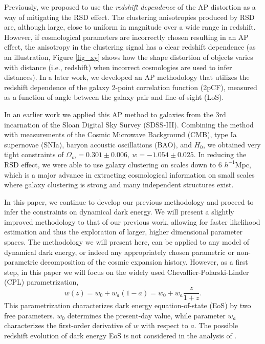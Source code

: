 \documentclass[iop]{emulateapj}
\begin{document}
Previously, we proposed to use the {\it redshift dependence} of the AP distortion\cite{Li2014} as a way of mitigating the RSD effect. The clustering anisotropies produced by RSD are, although large, close to uniform in magnitude over a wide range in redshift.  However, if cosmological parameters are incorrectly chosen resulting in an AP effect, 
the anisotropy in the clustering signal has a clear redshift dependence
(as an illustration, Figure \ref{fig_xy} shows how the shape distortion of objects varies with distance (i.e., redshift) 
when incorrect cosmologies are used to infer distances).
In a later work\cite{Li2015}, we developed an AP methodology 
that utilizes the redshift dependence of the galaxy 2-point correlation function (2pCF), 
measured as a function of angle between the galaxy pair and line-of-sight (LoS).


In an earlier work\citep{Li2016} we applied this AP method to galaxies from the 3rd incarnation of the Sloan Digital Sky Survey (SDSS-III). 
Combining the method with measurements of the Cosmic Microwave Background (CMB), type Ia supernovae (SNIa), 
baryon acoustic oscillations (BAO), and $H_0$,
we obtained very tight constraints of $ \Omega_m = 0.301 \pm 0.006,\ w=-1.054 \pm 0.025$.
In reducing the RSD effect, 
we were able to use galaxy clustering on scales down to 6 $h^{-1}$Mpc,
which is a major advance in extracting cosmological information 
on small scales where galaxy clustering is strong and many independent structures exist.



In this paper, we continue to develop our previous methodology and proceed to infer the constraints on dynamical dark energy. 
We will present a slightly improved methodology to that of our previous work\citep{Li2016}, 
allowing for faster likelihood estimation and thus the exploration of larger, higher dimensional parameter spaces. 
The methodology we will present here, can be applied to any model of dynamical dark energy, 
or indeed any appropriately chosen parametric or non-parametric decomposition of the cosmic expansion history. 
However, as a first step, in this paper we will focus on the widely used Chevallier-Polarski-Linder (CPL) parametrization\cite{CPL_CP,CPL_L},
\begin{equation}
w(z) = w_0 + w_a (1-a) = w_0 + w_a \frac{z}{1+z}.
\end{equation}
This parametrization characterizes dark energy equation-of-state (EoS) by two free parameters.
$w_0$ determines the present-day value, while parameter $w_a$ characterizes the first-order derivative of $w$ with respect to $a$. 
The possible redshift evolution of dark energy EoS is not considered in the analysis of \cite{Li2016}. 
\end{document}
